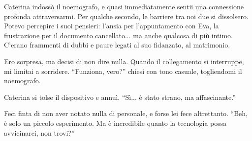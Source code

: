 \begin{center}
\begin{minipage}{0.7\textwidth}
    \centering
    
\end{minipage}
\end{center}


Caterina indossò il noemografo, e quasi immediatamente sentii una connessione profonda attraversarmi. Per qualche secondo, le barriere tra noi due si dissolsero. Potevo percepire i suoi pensieri: l'ansia per l'appuntamento con Eva, la frustrazione per il documento cancellato... ma anche qualcosa di più intimo. C'erano frammenti di dubbi e paure legati al suo fidanzato, al matrimonio.

Ero sorpresa, ma decisi di non dire nulla. Quando il collegamento si interruppe, mi limitai a sorridere. \enquote{Funziona, vero?} chiesi con tono casuale, togliendomi il noemografo.

Caterina si tolse il dispositivo e annuì. \enquote{Sì... è stato strano, ma affascinante.}

Feci finta di non aver notato nulla di personale, e forse lei fece altrettanto. \enquote{Beh, è solo un piccolo esperimento. Ma è incredibile quanto la tecnologia possa avvicinarci, non trovi?}

